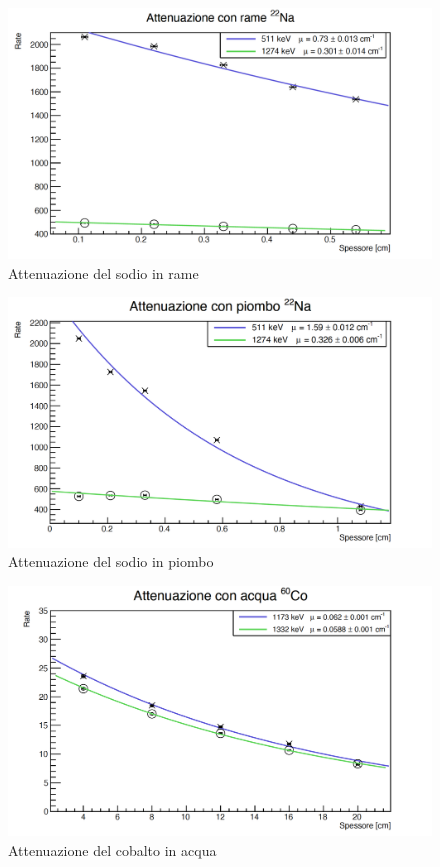 \documentclass[a4paper,10pt]{article}
\begin{document}
\begin{figure}[H]
    \centering
    \includegraphics[scale=0.6]{grafici/attenuazionesodiorame}
    \caption{Attenuazione del sodio in rame}
\end{figure}

\begin{figure}[H]
    \centering
    \includegraphics[scale=0.6]{grafici/attenuazionesodiopiombo}
    \caption{Attenuazione del sodio in piombo}
\end{figure}

\begin{figure}[H]
    \centering
    \includegraphics[scale=0.6]{grafici/attenuazionecobaltoacqua}
    \caption{Attenuazione del cobalto in acqua}
\end{figure}
\end{document}
